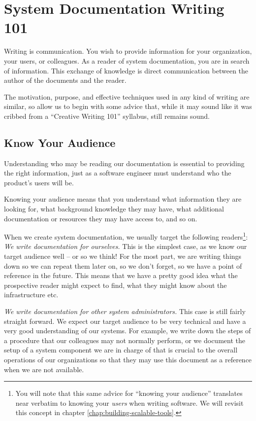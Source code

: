 \section{System Documentation Writing 101}
\label{documentation:system-documentation-writing}

Writing is communication.  You wish to provide
information for your organization, your users, or
colleagues.  As a reader of system documentation, you
are in search of information.  This exchange of
knowledge is direct communication between the author
of the documents and the reader.

The motivation, purpose, and effective techniques
used in any kind of writing are similar, so allow us
to begin with some advice that, while it may sound like
it was cribbed from a ``Creative Writing 101''
syllabus, still remains sound.

\subsection{Know Your Audience}
\label{documentation:creative:audience}

Understanding who may be reading our documentation is
essential to providing the right information, just as
a software engineer must understand who the product's
users will be.

Knowing your audience means that you understand what
information they are looking for, what background
knowledge they may have, what additional documentation
or resources they may have access to, and so on.

When we create system documentation, we usually target
the following readers\footnote{You will note that this
same advice for ``knowing your audience'' translates
near verbatim to knowing your {\em users} when writing
software.  We will revisit this concept in chapter
\ref{chap:building-scalable-tools}.}: \\

{\em We write documentation for ourselves.} This is
the simplest case, as we know our target audience well
-- or so we think!  For the most part, we are writing
things down so we can repeat them later on, so we
don't forget, so we have a point of reference in the
future.  This means that we have a pretty good idea
what the prospective reader might expect to find, what
they might know about the infrastructure etc.

{\em We write documentation for other system
administrators.} This case is still fairly straight
forward.  We expect our target audience to be very
technical and have a very good understanding of our
systems.  For example, we write down the steps of a
procedure that our colleagues may not normally
perform, or we document the setup of a system
component we are in charge of that is crucial to the
overall operations of our organizations so that they
may use this document as a reference when we are not
available.

